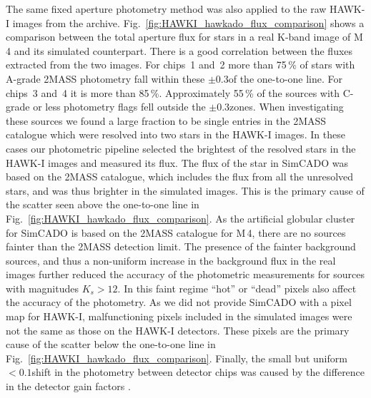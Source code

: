 The same fixed aperture photometry method was also applied to the raw HAWK-I images from the archive. Fig.~\ref{fig:HAWKI_hawkado_flux_comparison} shows a comparison between the total aperture flux for stars in a real K-band image of M\,4 and its simulated counterpart. There is a good correlation between the fluxes extracted from the two images. For chips~1 and~2 more than 75\,\% of stars with A-grade 2MASS photometry fall within these $\pm0.3$\m of the one-to-one line. For chips~3 and~4 it is more than 85\,\%. Approximately 55\,\% of the sources with C-grade or less photometry flags fell outside the $\pm0.3$\m zones. When investigating these sources we found a large fraction to be single entries in the 2MASS catalogue which were resolved into two stars in the HAWK-I images. In these cases our photometric pipeline selected the brightest of the resolved stars in the HAWK-I images and measured its flux. The flux of the star in SimCADO was based on the 2MASS catalogue, which includes the flux from all the unresolved stars, and was thus brighter in the simulated images. This is the primary cause of the scatter seen above the one-to-one line in Fig.~\ref{fig:HAWKI_hawkado_flux_comparison}. As the artificial globular cluster for SimCADO is based on the 2MASS catalogue for M\,4, there are no sources fainter than the 2MASS detection limit. The presence of the fainter background sources, and thus a non-uniform increase in the background flux in the real images further reduced the accuracy of the photometric measurements for sources with magnitudes $K_{s} > 12$\m. In this faint regime ``hot'' or ``dead'' pixels also affect the accuracy of the photometry. As we did not provide SimCADO with a pixel map for HAWK-I, malfunctioning pixels included in the simulated images were not the same as those on the HAWK-I detectors. These pixels are the primary cause of the scatter below the one-to-one line in Fig.~\ref{fig:HAWKI_hawkado_flux_comparison}. Finally, the small but uniform $< 0.1$\m shift in the photometry between detector chips was caused by the difference in the detector gain factors \citep{hawki}. 

